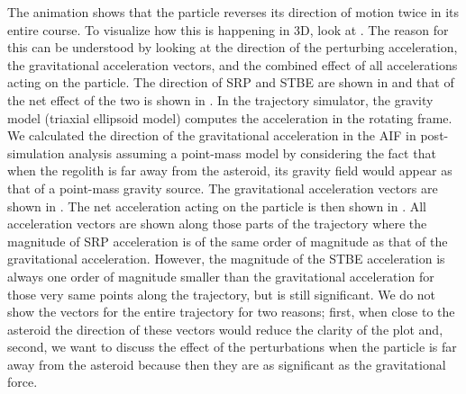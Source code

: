 %
\newline\newline
%
The animation shows that the particle reverses its direction of motion twice in its entire course. To visualize how this is happening in 3D, look at . The reason for this can be understood by looking at the direction of the perturbing acceleration, the gravitational acceleration vectors, and the combined effect of all accelerations acting on the particle. The direction of \gls{SRP} and \gls{STBE} are shown in  and that of the net effect of the two is shown in . In the trajectory simulator, the gravity model (triaxial ellipsoid model) computes the acceleration in the rotating frame. We calculated the direction of the gravitational acceleration in the \gls{AIF} in post-simulation analysis assuming a point-mass model by considering the fact that when the regolith is far away from the asteroid, its gravity field would appear as that of a point-mass gravity source. The gravitational acceleration vectors are shown in . The net acceleration acting on the particle is then shown in . All acceleration vectors are shown along those parts of the trajectory where the magnitude of \gls{SRP} acceleration is of the same order of magnitude as that of the gravitational acceleration. However, the magnitude of the \gls{STBE} acceleration is always one order of magnitude smaller than the gravitational acceleration for those very same points along the trajectory, but is still significant. We do not show the vectors for the entire trajectory for two reasons; first, when close to the asteroid the direction of these vectors would reduce the clarity of the plot and,  second, we want to discuss the effect of the perturbations when the particle is far away from the asteroid because then they are as significant as the gravitational force.
%
\newline\newline
%
